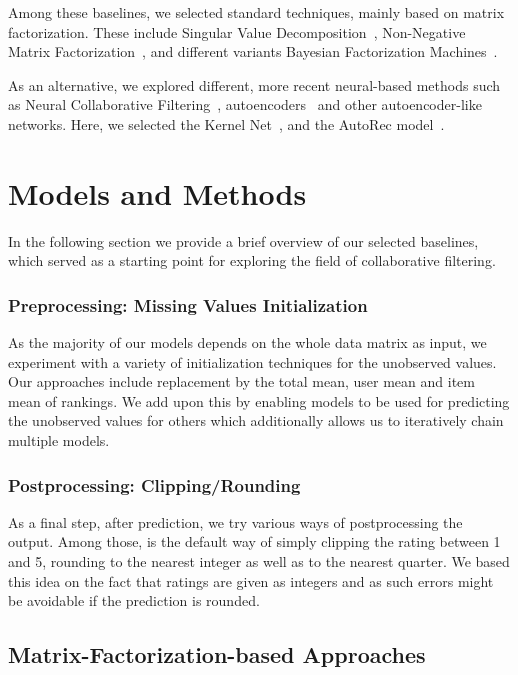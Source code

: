 \documentclass[10pt,conference,compsocconf]{IEEEtran}
\begin{document}
    Among these baselines, we selected standard techniques, mainly based on matrix factorization.
    These include Singular Value Decomposition~\cite{svd}, Non-Negative Matrix Factorization~\cite{6165290}, and different variants Bayesian Factorization Machines~\cite{freudenthaler_bayesian_2011, salakhutdinov_bayesian_2008}.

    As an alternative, we explored different, more recent neural-based methods such as Neural Collaborative Filtering~\cite{DBLP:journals/corr/abs-1708-05031}, autoencoders~\cite{inproceedings} and other autoencoder-like networks.
    Here, we selected the Kernel Net~\cite{pmlr-v80-muller18a}, and the AutoRec model~\cite{inproceedings}.


    \section{Models and Methods}
    In the following section we provide a brief overview of our selected baselines, which served as a starting point for exploring the field of collaborative filtering.

    \subsubsection{Preprocessing: Missing Values Initialization}\label{subsub:missing_init}
    As the majority of our models depends on the whole data matrix as input, we experiment with a variety of initialization techniques for the unobserved values.
    Our approaches include replacement by the total mean, user mean and item mean of rankings.
    We add upon this by enabling models to be used for predicting the unobserved values for others which additionally allows us to iteratively chain multiple models.

    \subsubsection{Postprocessing: Clipping/Rounding}
    As a final step, after prediction, we try various ways of postprocessing the output.
    Among those, is the default way of simply clipping the rating between 1 and 5, rounding to the nearest integer as well as to the nearest quarter.
    We based this idea on the fact that ratings are given as integers and as such errors might be avoidable if the prediction is rounded.

    \subsection{Matrix-Factorization-based Approaches}
\end{document}
